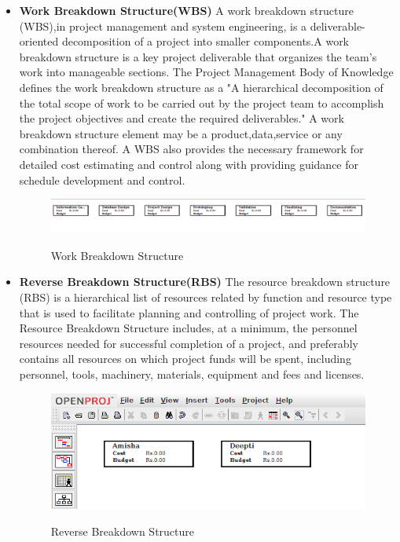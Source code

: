 \begin{itemize}
\item \textbf{Work Breakdown Structure(WBS)}
A work breakdown structure (WBS),in project management and system engineering, is a deliverable-oriented decomposition of a project into smaller components.A work breakdown structure is a key project deliverable that organizes the team's work into manageable sections. The Project Management Body of Knowledge defines the work breakdown structure as a "A hierarchical decomposition of the total scope of work to be carried out by the project team to accomplish the project objectives and create the required deliverables."
A work breakdown structure element may be a product,data,service or any combination thereof. A WBS also provides the necessary framework for detailed cost estimating and control along with providing guidance for schedule development and control.

\begin{figure}[!ht]
\centering
\includegraphics[width=1\linewidth]{input/images/am_wbs.png}
\label{fig:image1}
\caption{Work Breakdown Structure}
\end{figure}

\item \textbf{Reverse Breakdown Structure(RBS)}
The resource breakdown structure (RBS) is a hierarchical list of resources related by function and resource type that is used to facilitate planning and controlling of project work. The Resource Breakdown Structure includes, at a minimum, the personnel resources needed for successful completion of a project, and preferably contains all resources on which project funds will be spent, including personnel, tools, machinery, materials, equipment and fees and licenses.

\begin{figure}[!ht]
\centering
\includegraphics[width=1\linewidth]{input/images/am_rbs.png}
\label{fig:image1}
\caption{Reverse Breakdown Structure}
\end{figure}


\end{itemize}
